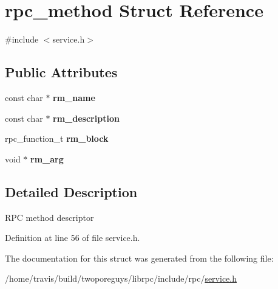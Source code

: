 \hypertarget{structrpc__method}{\section{rpc\-\_\-method Struct Reference}
\label{structrpc__method}
}


{\ttfamily \#include $<$service.\-h$>$}

\subsection*{Public Attributes}
\begin{DoxyCompactItemize}
\item 
\hypertarget{structrpc__method_abeff7db58d8903e9e6827d4acac7a8a0}{const char $\ast$ {\bfseries rm\-\_\-name}}\label{structrpc__method_abeff7db58d8903e9e6827d4acac7a8a0}

\item 
\hypertarget{structrpc__method_ab384c866584326d2e06c04ce1972a65a}{const char $\ast$ {\bfseries rm\-\_\-description}}\label{structrpc__method_ab384c866584326d2e06c04ce1972a65a}

\item 
\hypertarget{structrpc__method_ad6f2db7ebb8d4747730d4cb25b0c6824}{rpc\-\_\-function\-\_\-t {\bfseries rm\-\_\-block}}\label{structrpc__method_ad6f2db7ebb8d4747730d4cb25b0c6824}

\item 
\hypertarget{structrpc__method_afc4708084618f0879e54efda3292cf8c}{void $\ast$ {\bfseries rm\-\_\-arg}}\label{structrpc__method_afc4708084618f0879e54efda3292cf8c}

\end{DoxyCompactItemize}


\subsection{Detailed Description}
R\-P\-C method descriptor 

Definition at line 56 of file service.\-h.



The documentation for this struct was generated from the following file\-:\begin{DoxyCompactItemize}
\item 
/home/travis/build/twoporeguys/librpc/include/rpc/\hyperlink{service_8h}{service.\-h}\end{DoxyCompactItemize}
